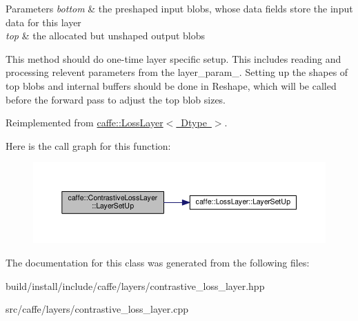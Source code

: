 \begin{DoxyParams}{Parameters}
{\em bottom} & the preshaped input blobs, whose data fields store the input data for this layer \\
\hline
{\em top} & the allocated but unshaped output blobs\\
\hline
\end{DoxyParams}
This method should do one-\/time layer specific setup. This includes reading and processing relevent parameters from the {\ttfamily layer\+\_\+param\+\_\+}. Setting up the shapes of top blobs and internal buffers should be done in {\ttfamily Reshape}, which will be called before the forward pass to adjust the top blob sizes. 

Reimplemented from \mbox{\hyperlink{classcaffe_1_1_loss_layer_aa6fc7c2e90be66f1c1f0683637c949da}{caffe\+::\+Loss\+Layer$<$ Dtype $>$}}.

Here is the call graph for this function\+:
\nopagebreak
\begin{figure}[H]
\begin{center}
\leavevmode
\includegraphics[width=350pt]{classcaffe_1_1_contrastive_loss_layer_a943e67e7bb9c2362ec20ce44c777beac_cgraph}
\end{center}
\end{figure}


The documentation for this class was generated from the following files\+:\begin{DoxyCompactItemize}
\item 
build/install/include/caffe/layers/contrastive\+\_\+loss\+\_\+layer.\+hpp\item 
src/caffe/layers/contrastive\+\_\+loss\+\_\+layer.\+cpp\end{DoxyCompactItemize}
